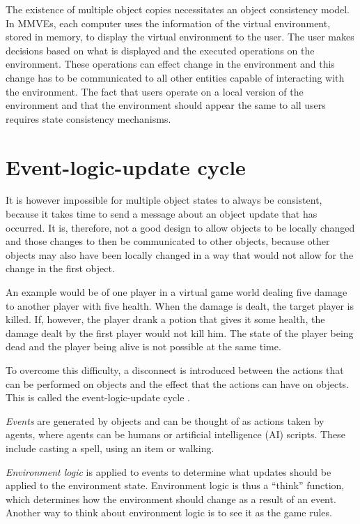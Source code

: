 The existence of multiple object copies necessitates an object consistency model. In MMVEs, each computer uses the information of the virtual environment, stored in memory, to display the virtual environment to the user. The user makes decisions based on what is displayed and the executed operations on the environment. These operations can effect change in the environment and this change has to be communicated to all other entities capable of interacting with the environment. The fact that users operate on a local version of the environment and that the environment should appear the same to all users requires state consistency mechanisms.

\section{Event-logic-update cycle}
\label{event_logic_update}

It is however impossible for multiple object states to always be consistent, because it takes time to send a message about an object update that has occurred. It is, therefore, not a good design to allow objects to be locally changed and those changes to then be communicated to other objects, because other objects may also have been locally changed in a way that would not allow for the change in the first object.

An example would be of one player in a virtual game world dealing five damage to another player with five health. When the damage is dealt, the target player is killed. If, however, the player drank a potion that gives it some health, the damage dealt by the first player would not kill him. The state of the player being dead and the player being alive is not possible at the same time.

To overcome this difficulty, a disconnect is introduced between the actions that can be performed on objects and the effect that the actions can have on objects. This is called the event-logic-update cycle \cite{}.

\emph{Events} are generated by objects and can be thought of as actions taken by agents, where agents can be humans or artificial intelligence (AI) scripts. These include casting a spell, using an item or walking.

\emph{Environment logic} is applied to events to determine what updates should be applied to the environment state. Environment logic is thus a ``think'' function, which determines how the environment should change as a result of an event. Another way to think about environment logic is to see it as the game rules.

